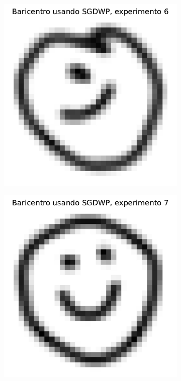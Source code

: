 \begin{figure}[H]
\begin{subfigure}[b]{0.17\textwidth}
        \label{fig:bar-SGDWP-exp-05}
    \end{subfigure}
    \newline
    \begin{subfigure}[b]{0.17\textwidth}
        \centering
        \includegraphics[width=\textwidth]{img/sgdwp/bar-SGDWP-exp-06.pdf}
        \label{fig:bar-SGDWP-exp-06}
    \end{subfigure}
    \hfill
    \begin{subfigure}[b]{0.17\textwidth}
        \centering
        \includegraphics[width=\textwidth]{img/sgdwp/bar-SGDWP-exp-07.pdf}

\end{subfigure}
\end{figure}
